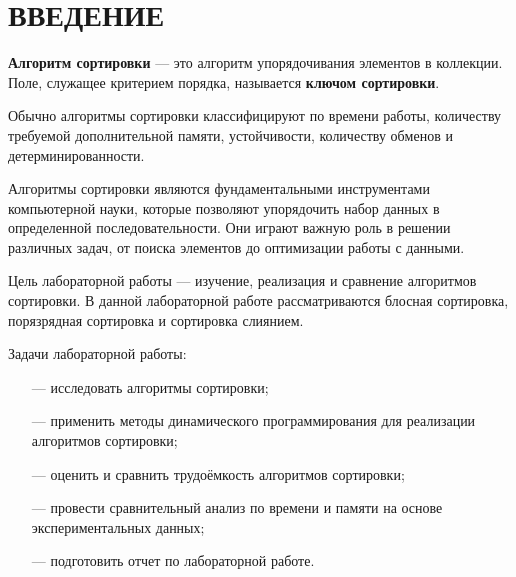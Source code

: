 \chapter*{ВВЕДЕНИЕ}

\textbf{Алгоритм сортировки}  --- это алгоритм упорядочивания элементов в коллекции. Поле, служащее критерием порядка, называется \textbf{ключом сортировки}.

Обычно алгоритмы сортировки классифицируют по времени работы, количеству требуемой дополнительной памяти, устойчивости, количеству обменов и детерминированности.

Алгоритмы сортировки являются фундаментальными инструментами компьютерной науки, которые позволяют упорядочить набор данных в определенной последовательности. Они играют важную роль в решении различных задач, от поиска элементов до оптимизации работы с данными.

Цель лабораторной работы ---  изучение, реализация и сравнение алгоритмов
сортировки. В данной лабораторной работе рассматриваются блосная сортировка, порязрядная сортировка и сортировка слиянием.

Задачи лабораторной работы:

\begin{itemize}
	\item[---] исследовать алгоритмы сортировки;
	\item[---] применить методы динамического программирования для реализации алгоритмов сортировки;
	\item[---] оценить и сравнить трудоёмкость алгоритмов сортировки;
	\item[---] провести сравнительный анализ по времени и памяти на основе экспериментальных данных;
	\item[---] подготовить отчет по лабораторной работе.
\end{itemize}

\pagebreak
